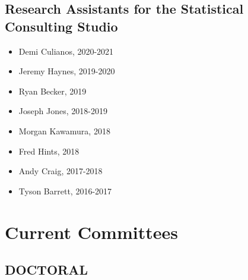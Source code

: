 \documentclass[11pt,a4paper,]{moderncv}
\providecommand{\tightlist}{%
	\setlength{\itemsep}{0pt}\setlength{\parskip}{0pt}}
\begin{document}
\hypertarget{research-assistants-for-the-statistical-consulting-studio}{%
\subsection{\texorpdfstring{\textbf{Research Assistants for the
Statistical Consulting
Studio}}{Research Assistants for the Statistical Consulting Studio}}\label{research-assistants-for-the-statistical-consulting-studio}}

\begin{itemize}
\tightlist
\item
  Demi Culianos, 2020-2021
\item
  Jeremy Haynes, 2019-2020
\item
  Ryan Becker, 2019
\item
  Joseph Jones, 2018-2019
\item
  Morgan Kawamura, 2018
\item
  Fred Hints, 2018
\item
  Andy Craig, 2017-2018
\item
  Tyson Barrett, 2016-2017
\end{itemize}

\vspace{7 mm}

\hypertarget{current-committees}{%
\section{Current Committees}\label{current-committees}}

\hypertarget{doctoral}{%
\subsection{\texorpdfstring{\textbf{DOCTORAL}}{DOCTORAL}}\label{doctoral}}
\end{document}
